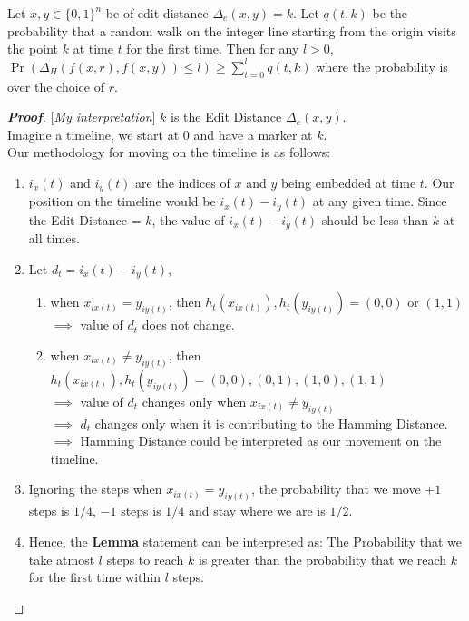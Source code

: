 \documentclass{article}
\begin{document}
\begin{lem} 
    Let $x,y \in \{0,1\}^n$ be of edit distance $\Delta_e(x,y) = k$. Let $q(t,k)$
    be the probability that a random walk on the integer line starting from the 
    origin visits the point $k$ at time $t$ for the first time. Then for any
    $l>0$, $\Pr(\Delta_H(f(x,r),f(x,y)) \leq l) \geq \sum_{t=0}^{l} q(t,k)$ 
    where the probability is over the choice of $r$.
\end{lem}

\begin{proof}[\textbf{Proof}][\textit{My interpretation}]
    $k$ is the Edit Distance $\Delta_e(x,y)$.\\
    Imagine a timeline, we start at 0 and have a marker at $k$.\\
    Our methodology for moving on the timeline is as follows:
    \begin{enumerate}
        \item $i_x(t)$ and $i_y(t)$ are the indices of $x$ and $y$ being embedded
        at time $t$. Our position on the timeline would be $i_x(t)-i_y(t)$ at any
        given time. Since the Edit Distance = $k$, the value of $i_x(t)-i_y(t)$
        should be less than $k$ at all times.
        \item Let $d_t=i_x(t)-i_y(t)$,
        \begin{enumerate}
            \item when $x_{ix(t)}=y_{iy(t)}$, then 
            $h_t(x_{ix(t)}),h_t(y_{iy(t)})=(0,0) \text{ or }(1,1) $\\
            $\implies $ value of $d_t$ does not change.\\

            \item when $x_{ix(t)}\neq y_{iy(t)}$, then 
            $h_t(x_{ix(t)}),h_t(y_{iy(t)})=(0,0),(0,1),(1,0),(1,1) $\\
            $\implies$ value of $d_t$ changes only when $x_{ix(t)} \neq y_{iy(t)}$ \\
            $\implies$ $d_t$ changes only when it is contributing to the Hamming Distance.
            $\implies$ Hamming Distance could be interpreted as our movement on the
            timeline.
        \end{enumerate}
        \item Ignoring the steps when $x_{ix(t)}=y_{iy(t)}$, the probability that
        we move $+1$ steps is $1/4$, $-1$ steps is $1/4$ and stay where we are
        is $1/2$. 
        \item Hence, the \textbf{Lemma} statement can be interpreted as: The Probability 
        that we take atmost $l$ steps to reach $k$ is greater than the probability 
        that we reach $k$ for the first time within $l$ steps.
    \end{enumerate}
\end{proof}




\end{document}
